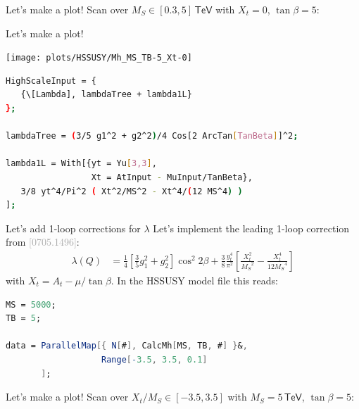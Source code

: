 \documentclass[hyperref={pdfpagelabels=false},ngerman]{beamer}
\newcommand{\eh}[1]{\,\mathsf{#1}}
\newcommand{\MS}{\ensuremath{M_S}}
\newcommand{\bigcite}[1]{\textcolor{darkgray}{[#1]}}
\begin{document}
\begin{frame}{Let's make a plot!}
  Scan over $\MS \in [0.3, 5]\eh{TeV}$ with $X_t = 0$, $\tan\beta = 5$:\\[2em]
  \usebox{\listbox}
\end{frame}

\begin{frame}{Let's make a plot!}
  \begin{center}
    \texttt{[image: plots/HSSUSY/Mh\_MS\_TB-5\_Xt-0]}
  \end{center}
\end{frame}

\begin{lrbox}{\listbox}\begin{lstlisting}[language=bash]
HighScaleInput = {
   {\[Lambda], lambdaTree + lambda1L}
};

lambdaTree = (3/5 g1^2 + g2^2)/4 Cos[2 ArcTan[TanBeta]]^2;

lambda1L = With[{yt = Yu[3,3],
                 Xt = AtInput - MuInput/TanBeta},
   3/8 yt^4/Pi^2 ( Xt^2/MS^2 - Xt^4/(12 MS^4) )
];
\end{lstlisting}\end{lrbox} %

\begin{frame}{Let's add 1-loop corrections for $\lambda$}
  Let's implement the leading 1-loop correction from
  \bigcite{0705.1496}:
  \begin{align*}
    \lambda(Q) &= \frac{1}{4} \left[ \frac{3}{5} g_1^2 + g_2^2 \right] \cos^2 2\beta
    + \frac{3}{8} \frac{y_t^4}{\pi^2}\left[
       \frac{X_t^2}{\MS^2}
       - \frac{X_t^4}{12 \MS^4}
    \right]
  \end{align*}
  with $X_t = A_t - \mu/\tan\beta$.
  In the HSSUSY model file this reads:\\[2em]
  \usebox{\listbox}
\end{frame}

\begin{lrbox}{\listbox}\begin{lstlisting}[language=Mathematica]
MS = 5000;
TB = 5;

data = ParallelMap[{ N[#], CalcMh[MS, TB, #] }&,
                   Range[-3.5, 3.5, 0.1]
       ];
\end{lstlisting}\end{lrbox} %

\begin{frame}{Let's make a plot!}
  Scan over $X_t/\MS \in [-3.5, 3.5]$ with $\MS = 5\eh{TeV}$, $\tan\beta = 5$:\\[2em]
  \usebox{\listbox}
\end{frame}
\end{document}
